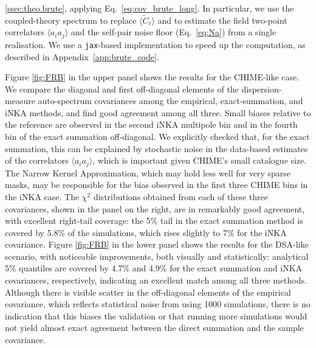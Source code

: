 \documentclass[%
 reprint,
superscriptaddress,
nofootinbib,
 amsmath,amssymb,
 aps,
 prd,
]{revtex4-2}
\begin{document}
\ref{ssec:theo.brute}, applying Eq.~\ref{eq:cov_brute_long}. In particular, we use the coupled-theory spectrum to replace $\langle \tilde{C}_\ell\rangle$ and to estimate the field two-point correlators $\langle a_i a_j\rangle$ and the self-pair noise floor (Eq.~\ref{eq:Na}) from a single realisation. We use a \texttt{jax}-based implementation to speed up the computation, as described in Appendix~\ref{app:brute_code}. 

    Figure \ref{fig:FRB} in the upper panel shows the results for the CHIME-like case. We compare the diagonal and first off-diagonal elements of the dispersion-measure auto-spectrum covariances among the empirical, exact-summation, and iNKA methods, and find good agreement among all three. Small biases relative to the reference are observed in the second iNKA multipole bin and in the fourth bin of the exact summation off-diagonal. We explicitly checked that, for the exact summation, this can be explained by stochastic noise in the data-based estimates of the correlators $\langle a_i a_j\rangle$, which is important given CHIME's small catalogue size. The Narrow Kernel Approximation, which may hold less well for very sparse masks, may be responsible for the bias observed in the first three CHIME bins in the iNKA case. The $\chi^2$ distributions obtained from each of these three covariances, shown in the panel on the right, are in remarkably good agreement, with excellent right-tail coverage: the 5$\%$ tail in the exact summation method is covered by 5.8\% of the simulations, which rises slightly to 7\% for the iNKA covariance. Figure \ref{fig:FRB} in the lower panel shows the results for the DSA-like scenario, with noticeable improvements, both visually and statistically: analytical 5$\%$ quantiles are covered by 4.7\% and 4.9\% for the exact summation and iNKA covariances, respectively, indicating an excellent match among all three methods. Although there is visible scatter in the off-diagonal elements of the empirical covariance, which reflects statistical noise from using 1000 simulations, there is no indication that this biases the validation or that running more simulations would not yield almost exact agreement between the direct summation and the sample covariance.
\end{document}
